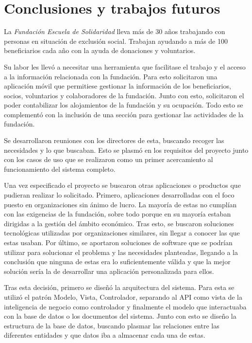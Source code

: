 \chapter{Conclusiones y trabajos futuros}

La \textit{Fundación Escuela de Solidaridad} lleva más de 30 años trabajando con personas en situación de exclusión social. Trabajan ayudando a más de 100 beneficiarios cada año con la ayuda de donaciones y voluntarios.

Su labor les llevó a necesitar una herramienta que facilitase el trabajo y el acceso a la información relacionada con la fundación. Para esto solicitaron una aplicación móvil que permitiese gestionar la información de los beneficiarios, socios, voluntarios y colaboradores de la fundación. Junto con esto, solicitaron el poder contabilizar los alojamientos de la fundación y su ocupación. Todo esto se complementó con la inclusión de una sección para gestionar las actividades de la fundación. 

Se desarrollaron reuniones con los directores de esta, buscando recoger las necesidades y lo que buscaban. Esto se plasmó en los requisitos del proyecto junto con los casos de uso que se realizaron como un primer acercamiento al funcionamiento del sistema completo. 

Una vez especificado el proyecto se buscaron otras aplicaciones o productos que pudieran realizar lo solicitado. Primero, aplicaciones desarrolladas con el foco puesto en organizaciones sin ánimo de lucro. La mayoría de estas no cumplían con las exigencias de la fundación, sobre todo porque en su mayoría estaban dirigidas a la gestión del ámbito económico. Tras esto, se buscaron soluciones tecnológicas utilizadas por organizaciones similares, sin llegar a conocer las que estas usaban. Por último, se aportaron soluciones de software que se podrían utilizar para solucionar el problema y las necesidades planteadas, llegando a la conclusión que ninguna de estas era lo suficientemente válida y que la mejor solución sería la de desarrollar una aplicación personalizada para ellos. 

Tras esta decisión, primero se diseñó la arquitectura del sistema. Para esta se utilizó el patrón Modelo, Vista, Controlador, separando al API como vista de la inteligencia de negocio como controlador y finalmente el modelo que interactuaba con la base de datos o los documentos del sistema. Junto con esto se diseño la estructura de la base de datos, buscando plasmar las relaciones entre las diferentes entidades y que datos iba a almacenar cada una de estas. 

